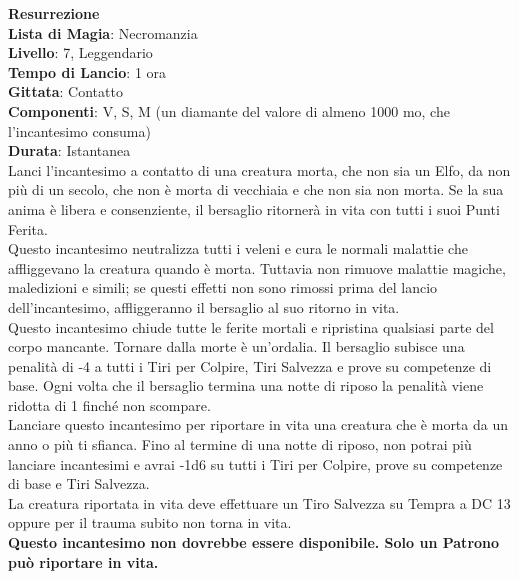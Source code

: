 \documentclass[a4paper,twoside,openany]{book}
\begin{document}
\begin{multicols}{2}
\medskip\textbf{Resurrezione}\\
\textbf{Lista di Magia}: Necromanzia\\
\textbf{Livello}: 7, Leggendario\\
\textbf{Tempo di Lancio}: 1 ora\\
\textbf{Gittata}: Contatto\\
\textbf{Componenti}: V, S, M (un diamante del valore di almeno 1000 mo, che l'incantesimo consuma)\\
\textbf{Durata}: Istantanea\\
Lanci l'incantesimo a contatto di una creatura morta, che non sia un Elfo, da non più di un secolo, che non è morta di vecchiaia e che non sia non morta. Se la sua anima è libera e consenziente, il bersaglio ritornerà in vita con tutti i suoi Punti Ferita.\\
Questo incantesimo neutralizza tutti i veleni e cura le normali malattie che affliggevano la creatura quando è morta. Tuttavia non rimuove malattie magiche, maledizioni e simili; se questi effetti non sono rimossi prima del lancio dell'incantesimo, affliggeranno il bersaglio al suo ritorno in vita.\\
Questo incantesimo chiude tutte le ferite mortali e ripristina qualsiasi parte del corpo mancante. Tornare dalla morte è un'ordalia. Il bersaglio subisce una penalità di -4 a tutti i Tiri per Colpire, Tiri Salvezza e prove su competenze di base. Ogni volta che il bersaglio termina una notte di riposo la penalità viene ridotta di 1 finché non scompare.\\
Lanciare questo incantesimo per riportare in vita una creatura che è morta da un anno o più ti sfianca. Fino al termine di una notte di riposo, non potrai più lanciare incantesimi e avrai -1d6 su tutti i Tiri per Colpire, prove su competenze di base e Tiri Salvezza.\\
La creatura riportata in vita deve effettuare un Tiro Salvezza su Tempra a DC 13 oppure per il trauma subito non torna in vita.\\
\textbf{Questo incantesimo non dovrebbe essere disponibile. Solo un Patrono può riportare in vita.}


\end{multicols}
\end{document}
